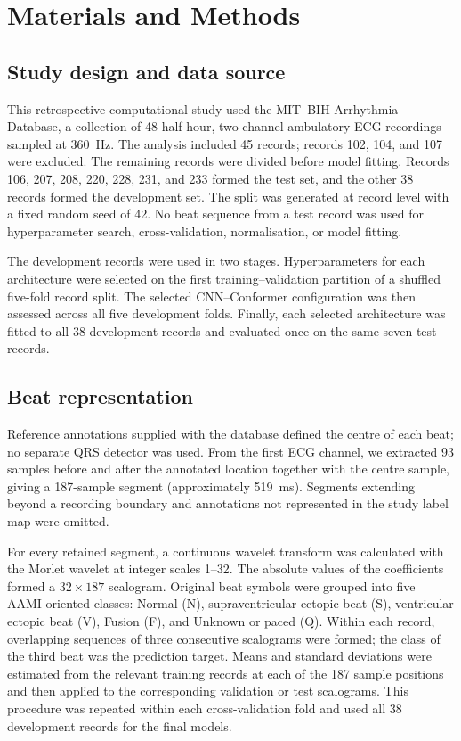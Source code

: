 \section{Materials and Methods}

\subsection{Study design and data source}
This retrospective computational study used the MIT--BIH Arrhythmia Database, a collection of 48 half-hour, two-channel ambulatory ECG recordings sampled at 360~Hz\cite{goldberger2000physiobank,moody2001impact}. The analysis included 45 records; records 102, 104, and 107 were excluded. The remaining records were divided before model fitting. Records 106, 207, 208, 220, 228, 231, and 233 formed the test set, and the other 38 records formed the development set. The split was generated at record level with a fixed random seed of 42. No beat sequence from a test record was used for hyperparameter search, cross-validation, normalisation, or model fitting.

The development records were used in two stages. Hyperparameters for each architecture were selected on the first training--validation partition of a shuffled five-fold record split. The selected CNN--Conformer configuration was then assessed across all five development folds. Finally, each selected architecture was fitted to all 38 development records and evaluated once on the same seven test records.

\subsection{Beat representation}
Reference annotations supplied with the database defined the centre of each beat; no separate QRS detector was used. From the first ECG channel, we extracted 93 samples before and after the annotated location together with the centre sample, giving a 187-sample segment (approximately 519~ms). Segments extending beyond a recording boundary and annotations not represented in the study label map were omitted.

For every retained segment, a continuous wavelet transform was calculated with the Morlet wavelet at integer scales 1--32. The absolute values of the coefficients formed a $32\times187$ scalogram. Original beat symbols were grouped into five AAMI-oriented classes: Normal (N), supraventricular ectopic beat (S), ventricular ectopic beat (V), Fusion (F), and Unknown or paced (Q)\cite{dechazal2004automatic}. Within each record, overlapping sequences of three consecutive scalograms were formed; the class of the third beat was the prediction target. Means and standard deviations were estimated from the relevant training records at each of the 187 sample positions and then applied to the corresponding validation or test scalograms. This procedure was repeated within each cross-validation fold and used all 38 development records for the final models.

